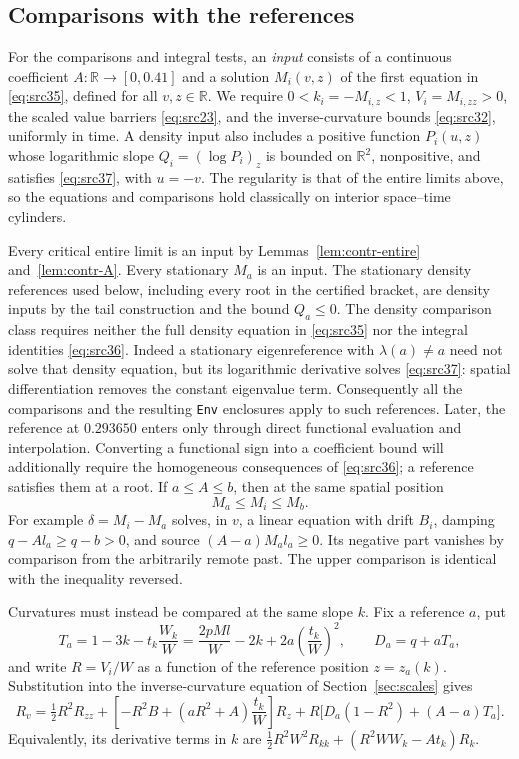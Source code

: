 \documentclass[11pt,a4paper]{article}
\numberwithin{equation}{section}
\theoremstyle{definition}
\theoremstyle{remark}
\newcommand{\R}{\mathbb R}
\begin{document}
\subsection{Comparisons with the references}
\label{subsec:contr-comparisons}

For the comparisons and integral tests, an \emph{input} consists of a
continuous coefficient $A:\R\to[0,0.41]$ and a solution $M_i(v,z)$ of
the first equation in \eqref{eq:src35}, defined for all $v,z\in\R$.
We require $0<k_i=-M_{i,z}<1$, $V_i=M_{i,zz}>0$, the scaled value
barriers \eqref{eq:src23}, and the inverse-curvature bounds
\eqref{eq:src32}, uniformly in time.  A density input also
includes a positive function $P_i(u,z)$ whose logarithmic slope
$Q_i=(\log P_i)_z$ is bounded on $\R^2$, nonpositive, and satisfies
\eqref{eq:src37}, with $u=-v$.  The regularity is that of the entire
limits above, so the equations and comparisons hold classically on
interior space--time cylinders.

Every critical entire limit is an input by
Lemmas~\ref{lem:contr-entire} and~\ref{lem:contr-A}.
Every stationary $M_a$ is an input.  The stationary density references
used below, including every root in the certified bracket, are density
inputs by the tail construction and the bound $Q_a\le0$.  The density
comparison class requires neither the full density equation in
\eqref{eq:src35} nor the integral identities \eqref{eq:src36}.  Indeed a stationary
eigenreference with $\lambda(a)\ne a$ need not solve that density
equation, but its logarithmic derivative solves \eqref{eq:src37}:
spatial differentiation removes the constant eigenvalue term.
Consequently all the comparisons and the resulting \texttt{Env}
enclosures apply to such references.  Later, the reference at
$0.293650$ enters only through direct functional evaluation and
interpolation.  Converting a functional sign into a coefficient bound
will additionally require the homogeneous consequences of
\eqref{eq:src36}; a reference satisfies them at a root.
If $a\le A\le b$, then at the same spatial position
\begin{equation}
 M_a\le M_i\le M_b.
 \label{eq:src41}
\end{equation}
For example $\delta=M_i-M_a$ solves, in $v$, a linear equation with
drift $B_i$, damping $q-Al_a\ge q-b>0$, and source
$(A-a)M_al_a\ge0$.  Its negative part vanishes by comparison from the
arbitrarily remote past.  The upper comparison is identical with the
inequality reversed.

Curvatures must instead be compared at the same slope $k$.  Fix a
reference $a$, put
\[
 T_a=1-3k-t_k\frac{W_k}{W}
     =\frac{2pMl}{W}-2k+2a\left(\frac{t_k}{W}\right)^2,
 \qquad D_a=q+aT_a,
\]
and write $R=V_i/W$ as a function of the reference position
$z=z_a(k)$.  Substitution into the inverse-curvature equation of
Section~\ref{sec:scales} gives
\begin{equation}
 R_v=\tfrac12R^2R_{zz}
    +\left[-R^2B+(aR^2+A)\frac{t_k}{W}\right]R_z
    +R\bigl[D_a(1-R^2)+(A-a)T_a\bigr].
 \label{eq:src42}
\end{equation}
Equivalently, its derivative terms in $k$ are
$\tfrac12R^2W^2R_{kk}+(R^2WW_k-At_k)R_k$.
\end{document}
